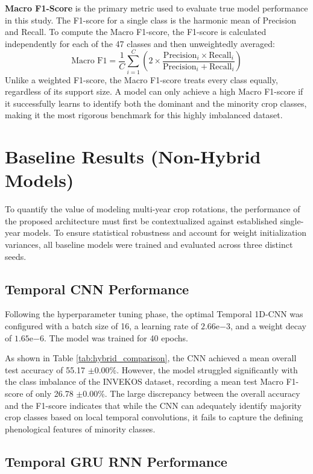 \textbf{Macro F1-Score} is the primary metric used to evaluate true model performance in this study. The F1-score for a single class is the harmonic mean of Precision and Recall.
To compute the Macro F1-score, the F1-score is calculated independently for each of the 47 classes and then unweightedly averaged:
$$ \text{Macro F1} = \frac{1}{C} \sum_{i=1}^{C} \left( 2 \times \frac{\text{Precision}_i \times \text{Recall}_i}{\text{Precision}_i + \text{Recall}_i} \right) $$
Unlike a weighted F1-score, the Macro F1-score treats every class equally, regardless of its support size.
A model can only achieve a high Macro F1-score if it successfully learns to identify both the dominant and the minority crop classes,
making it the most rigorous benchmark for this highly imbalanced dataset.


\section{Baseline Results (Non-Hybrid Models)}
\label{sec:baseline_results}

To quantify the value of modeling multi-year crop rotations, the performance of the proposed architecture must first be contextualized against established single-year models.
To ensure statistical robustness and account for weight initialization variances, all baseline models were trained and evaluated across three distinct seeds.

\subsection{Temporal CNN Performance}
\label{subsec:cnn_performance}

Following the hyperparameter tuning phase, the optimal Temporal 1D-CNN was configured with a batch size of 16, a learning rate of $2.66\mathrm{e}{-3}$,
and a weight decay of $1.65\mathrm{e}{-6}$. The model was trained for 40 epochs.

As shown in Table \ref{tab:hybrid_comparison}, the CNN achieved a mean overall test accuracy of 55.17 $\pm$0.00\%.
However, the model struggled significantly with the class imbalance of the INVEKOS dataset, recording a mean test Macro F1-score of only 26.78 $\pm$0.00\%.
The large discrepancy between the overall accuracy and the F1-score indicates that while the CNN can adequately identify majority crop classes based on local temporal convolutions,
it fails to capture the defining phenological features of minority classes.

\subsection{Temporal GRU RNN Performance}
\label{subsec:gru_performance}

